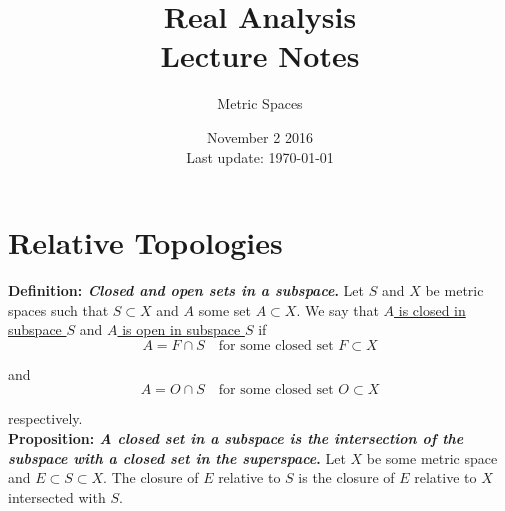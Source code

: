 \documentclass[12pt]{article}
\begin{document}
 
 
\title{Real Analysis\\Lecture Notes}
\author{Metric Spaces}
\date{November 2 2016 \\ Last update: \today{}}
\maketitle

\section{Relative Topologies}

%
%
{\bf Definition: {\em Closed and open sets in a subspace}.} Let $S$ and $X$ be metric spaces such that $S \subset X$ and $A$ some set $A \subset X$. We say that \underline{$A$ is closed in subspace $S$} and \underline{$A$ is open in subspace $S$} if
\begin{equation*}
	A = F \cap S \quad \text{for some closed set $F \subset X$}
\end{equation*}

and
\begin{equation*}
	A = O \cap S \quad \text{for some closed set $O \subset X$}
\end{equation*}

respectively. \\

%
%
{\bf Proposition: {\em A closed set in a subspace is the intersection of the subspace with a closed set in the superspace}.} Let $X$ be some metric space and $E \subset S \subset X$. The closure of $E$ relative to $S$ is the closure of $E$ relative to $X$ intersected with $S$.
\end{document}
